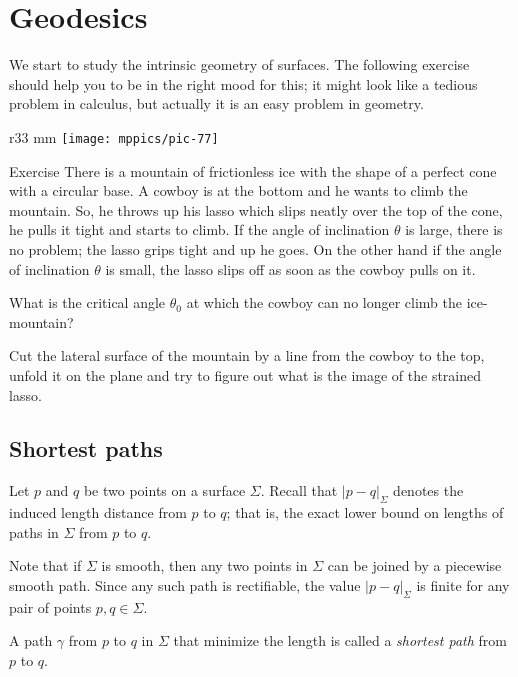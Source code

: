 \chapter{Geodesics}

We start to study the intrinsic geometry of surfaces.
The following exercise should help you to be in the right mood for this;
it might look like a tedious problem in calculus, but actually it is an easy problem in geometry.


\begin{wrapfigure}{r}{33 mm}
\vskip-0mm
\centering
\texttt{[image: mppics/pic-77]}
\vskip-0mm
\end{wrapfigure}

\begin{thm}{Exercise}\label{ex:lasso}
There is a mountain of frictionless ice with the shape of a perfect cone with a circular base.
A cowboy is at the bottom and he wants to climb the mountain.
So, he throws up his lasso which slips neatly over the top of the cone, he pulls it tight and starts to climb.
If the angle of inclination $\theta$ is large, there is no problem; the lasso grips tight and up he goes.
On the other hand if the angle of inclination $\theta$ is small, the lasso slips off as soon as the cowboy pulls on it.

What is the critical angle $\theta_0$ at which the cowboy can no longer climb the ice-mountain?
\end{thm}

 Cut the lateral surface of the mountain by a line from the cowboy to the top, unfold it on the plane and try to figure out what is the image of the strained lasso.

\section*{Shortest paths}

Let $p$ and $q$ be two points on a surface $\Sigma$.
Recall that $|p-q|_\Sigma$ denotes the induced length distance from $p$ to $q$;
that is, the exact lower bound on lengths of paths in $\Sigma$ from $p$ to $q$.

Note that if $\Sigma$ is smooth, then any two points in $\Sigma$ can be joined by a piecewise smooth path.
Since any such path is rectifiable, the value $|p-q|_\Sigma$ is finite for any pair of points $p,q\in\Sigma$.

A path $\gamma$ from $p$ to $q$ in $\Sigma$ that minimize the length is called a \emph{shortest path} from $p$ to $q$.

